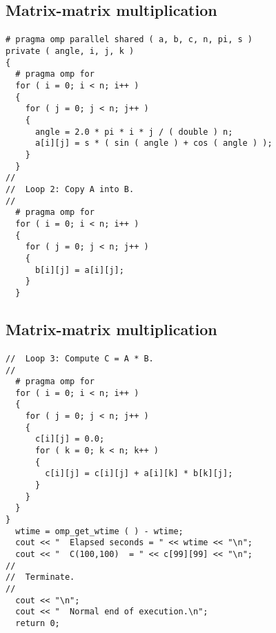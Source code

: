 \documentclass[%
oneside,                 %
final,                   %
10pt]{article}
\begin{document}
\subsection*{Matrix-matrix multiplication}

\paragraph{}
\begin{verbatim}
# pragma omp parallel shared ( a, b, c, n, pi, s ) 
private ( angle, i, j, k )
{
  # pragma omp for
  for ( i = 0; i < n; i++ )
  {
    for ( j = 0; j < n; j++ )
    {
      angle = 2.0 * pi * i * j / ( double ) n;
      a[i][j] = s * ( sin ( angle ) + cos ( angle ) );
    }
  }
//
//  Loop 2: Copy A into B.
//
  # pragma omp for
  for ( i = 0; i < n; i++ )
  {
    for ( j = 0; j < n; j++ )
    {
      b[i][j] = a[i][j];
    }
  }
\end{verbatim}





\subsection*{Matrix-matrix multiplication}

\paragraph{}
\begin{verbatim}
//  Loop 3: Compute C = A * B.
//
  # pragma omp for
  for ( i = 0; i < n; i++ )
  {
    for ( j = 0; j < n; j++ )
    {
      c[i][j] = 0.0;
      for ( k = 0; k < n; k++ )
      {
        c[i][j] = c[i][j] + a[i][k] * b[k][j];
      }
    }
  }
}
  wtime = omp_get_wtime ( ) - wtime;
  cout << "  Elapsed seconds = " << wtime << "\n";
  cout << "  C(100,100)  = " << c[99][99] << "\n";
//
//  Terminate.
//
  cout << "\n";
  cout << "  Normal end of execution.\n";
  return 0;
\end{verbatim}






\end{document}
